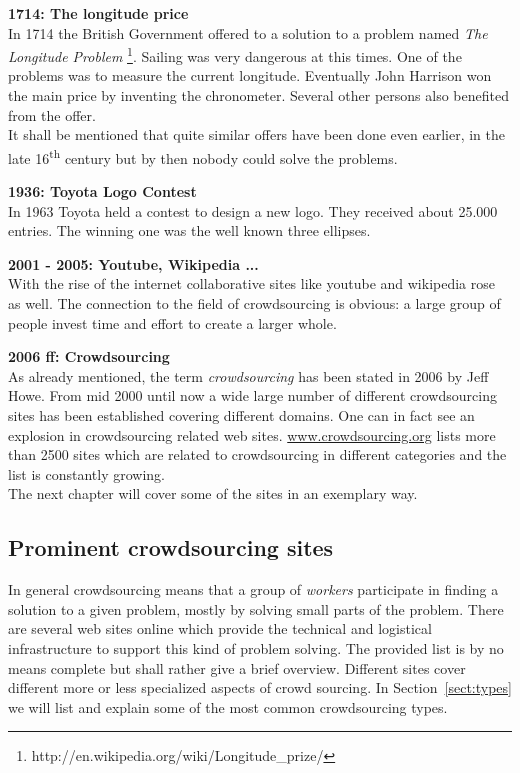 \documentclass{acm_proc_article-sp}
\begin{document}
\textbf{1714: The longitude price}\\
In 1714 the British Government offered  to a solution to a problem named \textit{The Longitude Problem} \footnote{http://en.wikipedia.org/wiki/Longitude\_prize/}. Sailing was very dangerous at this times. One of the problems was to measure the current longitude. Eventually John Harrison won the main price by inventing the chronometer. Several other persons also benefited from the offer.\\
It shall be mentioned that quite similar offers have been done even earlier, in the late 16\textsuperscript{th} century but by then nobody could solve the problems.

\textbf{1936: Toyota Logo Contest}\\
In 1963 Toyota held a contest to design a new logo. They received about 25.000 entries. The winning one was the well known three ellipses.

\textbf{2001 - 2005: Youtube, Wikipedia ...}\\
With the rise of the internet collaborative sites like youtube and wikipedia rose as well. The connection to the field of crowdsourcing is obvious: a large group of people invest time and effort to create a larger whole.

\textbf{2006 ff: Crowdsourcing}\\
As already mentioned, the term \textit{crowdsourcing} has been stated in 2006 by Jeff Howe. From mid 2000 until now a wide large number of different crowdsourcing sites has been established covering different domains. One can in fact see an explosion in crowdsourcing related web sites. \href{http://www.crowdsourcing.org/directory}{www.crowdsourcing.org} lists more than 2500 sites which are related to crowdsourcing in different categories and the list is constantly growing.\\
The next chapter will cover some of the sites in an exemplary way.

\subsection{Prominent crowdsourcing sites}
In general crowdsourcing means that a group of \textit{workers} participate in finding a solution to a given problem, mostly by solving small parts of the problem. There are several web sites online which provide the technical and logistical infrastructure to support this kind of problem solving. The provided list is by no means complete but shall rather give a brief overview. Different sites cover different more or less specialized aspects of crowd sourcing. In Section~\ref{sect:types} we will list and explain some of the most common crowdsourcing types.
\end{document}
